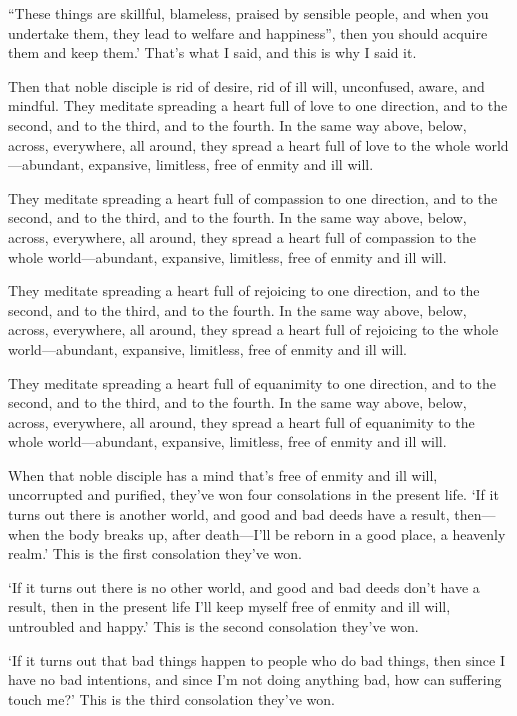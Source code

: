 \documentclass[12pt,openany]{book}%
\begin{document}
“These things are skillful, blameless, praised by sensible people, and when you undertake them, they lead to welfare and happiness”, then you should acquire them and keep them.’ That’s what I said, and this is why I said it. 

Then that noble disciple is rid of desire, rid of ill will, unconfused, aware, and mindful. They meditate spreading a heart full of love to one direction, and to the second, and to the third, and to the fourth. In the same way above, below, across, everywhere, all around, they spread a heart full of love to the whole world—abundant, expansive, limitless, free of enmity and ill will. 

They meditate spreading a heart full of compassion to one direction, and to the second, and to the third, and to the fourth. In the same way above, below, across, everywhere, all around, they spread a heart full of compassion to the whole world—abundant, expansive, limitless, free of enmity and ill will. 

They meditate spreading a heart full of rejoicing to one direction, and to the second, and to the third, and to the fourth. In the same way above, below, across, everywhere, all around, they spread a heart full of rejoicing to the whole world—abundant, expansive, limitless, free of enmity and ill will. 

They meditate spreading a heart full of equanimity to one direction, and to the second, and to the third, and to the fourth. In the same way above, below, across, everywhere, all around, they spread a heart full of equanimity to the whole world—abundant, expansive, limitless, free of enmity and ill will. 

When that noble disciple has a mind that’s free of enmity and ill will, uncorrupted and purified, they’ve won four consolations in the present life. ‘If it turns out there is another world, and good and bad deeds have a result, then—when the body breaks up, after death—I’ll be reborn in a good place, a heavenly realm.’ This is the first consolation they’ve won. 

‘If it turns out there is no other world, and good and bad deeds don’t have a result, then in the present life I’ll keep myself free of enmity and ill will, untroubled and happy.’ This is the second consolation they’ve won. 

‘If it turns out that bad things happen to people who do bad things, then since I have no bad intentions, and since I’m not doing anything bad, how can suffering touch me?’ This is the third consolation they’ve won. 
\end{document}
